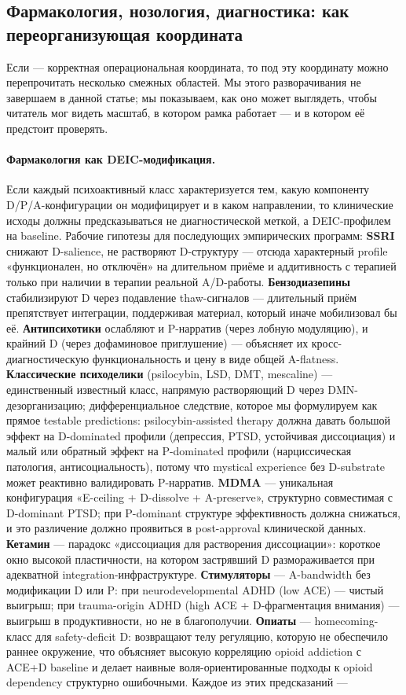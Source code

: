 \subsection{Фармакология, нозология, диагностика: \DEIC{} как переорганизующая координата}
\label{subsec:pharmacology_nosology}

Если \DEIC{} --- корректная операциональная координата, то под эту координату можно перепрочитать несколько смежных областей. Мы этого разворачивания не завершаем в данной статье; мы показываем, как оно может выглядеть, чтобы читатель мог видеть масштаб, в котором рамка работает --- и в котором её предстоит проверять.

\paragraph{Фармакология как DEIC-модификация.} Если каждый психоактивный класс характеризуется тем, какую компоненту D/P/A-конфигурации он модифицирует и в каком направлении, то клинические исходы должны предсказываться не диагностической меткой, а DEIC-профилем на baseline. Рабочие гипотезы для последующих эмпирических программ: \textbf{SSRI} снижают D-salience, не растворяют D-структуру --- отсюда характерный profile «функционален, но отключён» на длительном приёме и аддитивность с терапией только при наличии в терапии реальной A/D-работы. \textbf{Бензодиазепины} стабилизируют D через подавление thaw-сигналов --- длительный приём препятствует интеграции, поддерживая материал, который иначе мобилизовал бы её. \textbf{Антипсихотики} ослабляют и P-нарратив (через лобную модуляцию), и крайний D (через дофаминовое приглушение) --- объясняет их кросс-диагностическую функциональность и цену в виде общей A-flatness. \textbf{Классические психоделики} (psilocybin, LSD, DMT, mescaline) --- единственный известный класс, напрямую растворяющий D через DMN-дезорганизацию; дифференциальное следствие, которое мы формулируем как прямое testable predictions: psilocybin-assisted therapy должна давать большой эффект на D-dominated профили (депрессия, PTSD, устойчивая диссоциация) и малый или обратный эффект на P-dominated профили (нарциссическая патология, антисоциальность), потому что mystical experience без D-substrate может реактивно валидировать P-нарратив. \textbf{MDMA} --- уникальная конфигурация «E-ceiling + D-dissolve + A-preserve», структурно совместимая с D-dominant PTSD; при P-dominant структуре эффективность должна снижаться, и это различение должно проявиться в post-approval клинической данных. \textbf{Кетамин} --- парадокс «диссоциация для растворения диссоциации»: короткое окно высокой пластичности, на котором застрявший D размораживается при адекватной integration-инфраструктуре. \textbf{Стимуляторы} --- A-bandwidth без модификации D или P: при neurodevelopmental ADHD (low ACE) --- чистый выигрыш; при trauma-origin ADHD (high ACE + D-фрагментация внимания) --- выигрыш в продуктивности, но не в благополучии. \textbf{Опиаты} --- homecoming-класс для safety-deficit D: возвращают телу регуляцию, которую не обеспечило раннее окружение, что объясняет высокую корреляцию opioid addiction с ACE+D baseline и делает наивные воля-ориентированные подходы к opioid dependency структурно ошибочными. Каждое из этих предсказаний --- 